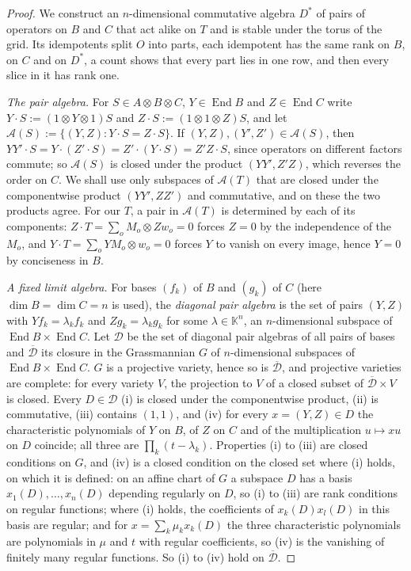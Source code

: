 \documentclass[11pt]{article}
\theoremstyle{definition}
\theoremstyle{remark}
\begin{document}
\begin{proof}
We construct an $n$-dimensional commutative algebra $D^*$ of pairs of operators on $B$ and $C$ that act alike on $T$ and is stable under the torus of the grid. Its idempotents split $O$ into parts, each idempotent has the same rank on $B$, on $C$ and on $D^*$, a count shows that every part lies in one row, and then every slice in it has rank one.

\emph{The pair algebra.} For $S\in A\otimes B\otimes C$, $Y\in\operatorname{End}B$ and $Z\in\operatorname{End}C$ write $Y\cdot S:=(1\otimes Y\otimes1)S$ and $Z\cdot S:=(1\otimes1\otimes Z)S$, and let $\mathcal A(S):=\{(Y,Z):Y\cdot S=Z\cdot S\}$. If $(Y,Z),(Y',Z')\in\mathcal A(S)$, then $YY'\cdot S=Y\cdot(Z'\cdot S)=Z'\cdot(Y\cdot S)=Z'Z\cdot S$, since operators on different factors commute; so $\mathcal A(S)$ is closed under the product $(YY',Z'Z)$, which reverses the order on $C$. We shall use only subspaces of $\mathcal A(T)$ that are closed under the componentwise product $(YY',ZZ')$ and commutative, and on these the two products agree. For our $T$, a pair in $\mathcal A(T)$ is determined by each of its components: $Z\cdot T=\sum_o M_o\otimes Zw_o=0$ forces $Z=0$ by the independence of the $M_o$, and $Y\cdot T=\sum_o YM_o\otimes w_o=0$ forces $Y$ to vanish on every image, hence $Y=0$ by conciseness in $B$.

\emph{A fixed limit algebra.} For bases $(f_k)$ of $B$ and $(g_k)$ of $C$ (here $\dim B=\dim C=n$ is used), the \emph{diagonal pair algebra} is the set of pairs $(Y,Z)$ with $Yf_k=\lambda_kf_k$ and $Zg_k=\lambda_kg_k$ for some $\lambda\in\mathbb K^n$, an $n$-dimensional subspace of $\operatorname{End}B\times\operatorname{End}C$. Let $\mathcal D$ be the set of diagonal pair algebras of all pairs of bases and $\overline{\mathcal D}$ its closure in the Grassmannian $G$ of $n$-dimensional subspaces of $\operatorname{End}B\times\operatorname{End}C$. $G$ is a projective variety, hence so is $\overline{\mathcal D}$, and projective varieties are complete: for every variety $V$, the projection to $V$ of a closed subset of $\overline{\mathcal D}\times V$ is closed. Every $D\in\mathcal D$ (i) is closed under the componentwise product, (ii) is commutative, (iii) contains $(1,1)$, and (iv) for every $x=(Y,Z)\in D$ the characteristic polynomials of $Y$ on $B$, of $Z$ on $C$ and of the multiplication $u\mapsto xu$ on $D$ coincide; all three are $\prod_k(t-\lambda_k)$. Properties (i) to (iii) are closed conditions on $G$, and (iv) is a closed condition on the closed set where (i) holds, on which it is defined: on an affine chart of $G$ a subspace $D$ has a basis $x_1(D),\dots,x_n(D)$ depending regularly on $D$, so (i) to (iii) are rank conditions on regular functions; where (i) holds, the coefficients of $x_k(D)x_l(D)$ in this basis are regular; and for $x=\sum_k\mu_kx_k(D)$ the three characteristic polynomials are polynomials in $\mu$ and $t$ with regular coefficients, so (iv) is the vanishing of finitely many regular functions. So (i) to (iv) hold on $\overline{\mathcal D}$.


\end{proof}
\end{document}
